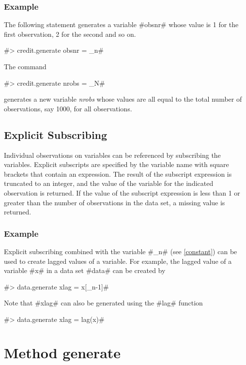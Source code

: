 \subsubsection*{Example}

The following statement generates a variable #obsnr# whose value is 1 for the first observation, 2 for the second and so on.

#> credit.generate obsnr = _n#

The command

#> credit.generate nrobs = _N#

generates a new variable {\em nrobs} whose values are all equal to the total number of observations, say 1000, for all observations.

\subsection{Explicit Subscribing}

Individual observations on variables can be referenced by subscribing the variables. Explicit subscripts are specified by
the variable name with square brackets that contain an expression. The result of the subscript expression is truncated to an integer, and the value of the variable for the indicated observation is returned. If  the value of the subscript expression is less than 1 or greater than the number of observations in the data set, a missing value is returned.

\subsubsection*{Example}

Explicit subscribing combined with the variable #_n# (see \autoref{constant}) can be used to create lagged values of a
variable. For example, the lagged value of a variable #x# in a data set #data# can be created by

#> data.generate xlag = x[_n-1]#

Note that #xlag# can also be generated using the #lag# function

#> data.generate xlag = lag(x)#


\section{Method generate}
 \label{generate} 

